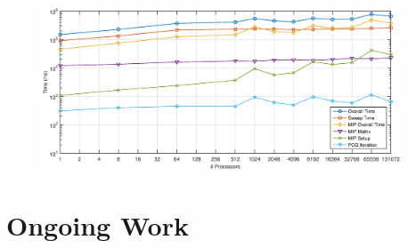 \documentclass[]{beamer}
\begin{document}
\subsection{}
\begin{frame}[t]\frametitle{}
\end{frame}
\begin{frame}[t]\frametitle{}
\end{frame}
\begin{frame}[t]\frametitle{}
\end{frame}
\begin{frame}[t]\frametitle{}
\end{frame}
\begin{frame}[t]\frametitle{}
\begin{figure}[t]
\centering
\includegraphics[width=0.95\textwidth]{images/Vulcan_DSA_Timing.eps}
\end{figure}
\end{frame}
\begin{frame}[t]\frametitle{}
\end{frame}
\section{Ongoing Work}
\subsection{}
\begin{frame}[t]\frametitle{}

\end{frame}
\begin{frame}[t]\frametitle{}

\end{frame}
\begin{frame}[t]\frametitle{}

\end{frame}
\end{document}
